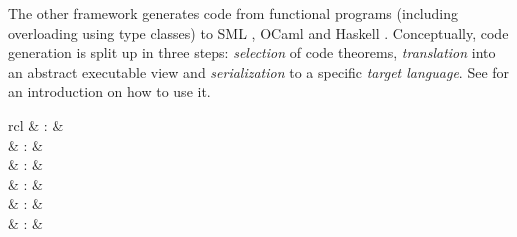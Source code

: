 \begin{isabellebody}
\begin{isamarkuptext}
  \medskip The other framework generates code from functional programs
  (including overloading using type classes) to SML \cite{SML}, OCaml
  \cite{OCaml} and Haskell \cite{haskell-revised-report}.
  Conceptually, code generation is split up in three steps:
  \emph{selection} of code theorems, \emph{translation} into an
  abstract executable view and \emph{serialization} to a specific
  \emph{target language}.  See \cite{isabelle-codegen} for an
  introduction on how to use it.

  \begin{matharray}{rcl}
    \hypertarget{command.HOL.export-code}{\hyperlink{command.HOL.export-code}{\mbox{}}}\isa{{\isachardoublequote}\isactrlsup {\isacharasterisk}{\isachardoublequote}} & : &  \\
    \hypertarget{command.HOL.code-thms}{\hyperlink{command.HOL.code-thms}{\mbox{}}}\isa{{\isachardoublequote}\isactrlsup {\isacharasterisk}{\isachardoublequote}} & : &  \\
    \hypertarget{command.HOL.code-deps}{\hyperlink{command.HOL.code-deps}{\mbox{}}}\isa{{\isachardoublequote}\isactrlsup {\isacharasterisk}{\isachardoublequote}} & : &  \\
    \hypertarget{command.HOL.code-datatype}{\hyperlink{command.HOL.code-datatype}{\mbox{}}} & : &  \\
    \hypertarget{command.HOL.code-const}{\hyperlink{command.HOL.code-const}{\mbox{}}} & : &  \\
    \hypertarget{command.HOL.code-type}{\hyperlink{command.HOL.code-type}{\mbox{}}} & : &  \\

\end{matharray}
\end{isamarkuptext}
\end{isabellebody}
